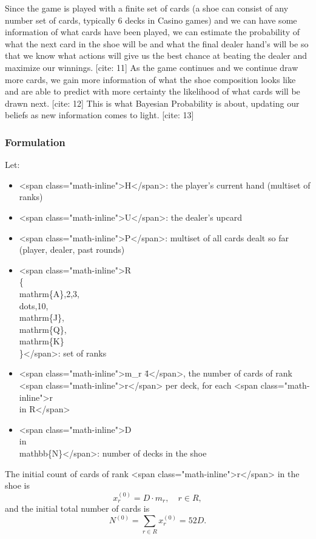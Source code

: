 \documentclass[12pt,a4paper]{cibb}
\begin{document}
Since the game is played with a finite set of cards (a shoe can consist of any number set of cards, typically 6 decks in Casino games) and we can have some information of what cards have been played, we can estimate the probability of what the next card in the shoe will be and what the final dealer hand's will be so that we know what actions will give us the best chance at beating the dealer and maximize our winnings. [cite: 11]
As the game continues and we continue draw more cards, we gain more information of what the shoe composition looks like and are able to predict with more certainty the likelihood of what cards will be drawn next. [cite: 12]
This is what Bayesian Probability is about, updating our beliefs as new information comes to light. [cite: 13]

\subsubsection{Formulation}
Let:
    \begin{itemize}
  \item <span class="math-inline">H</span>: the player's current hand (multiset of ranks)
  \item <span class="math-inline">U</span>: the dealer's upcard
  \item <span class="math-inline">P</span>: multiset of all cards dealt so far (player, dealer, past rounds)
  \item <span class="math-inline">R \= \\\{\\mathrm\{A\},2,3,\\dots,10,\\mathrm\{J\},\\mathrm\{Q\},\\mathrm\{K\}\\\}</span>: set of ranks
  \item <span class="math-inline">m\_r \= 4</span>, the number of cards of rank <span class="math-inline">r</span> per deck, for each <span class="math-inline">r\\in R</span>
  \item <span class="math-inline">D\\in\\mathbb\{N\}</span>: number of decks in the shoe
\end{itemize}

The initial count of cards of rank <span class="math-inline">r</span> in the shoe is
\[
  x_r^{(0)} = D \cdot m_r, \quad r\in R,
\]
and the initial total number of cards is
\[
  N^{(0)} = \sum_{r\in R} x_r^{(0)} = 52D.
\]
\end{document}

